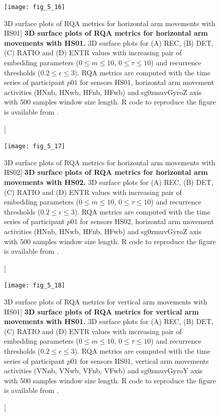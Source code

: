 \begin{figure}
\centering
\texttt{[image: fig\_5\_16]}
    \caption
	[3D surface plots of RQA metrics for horizontal arm movements with HS01]{
	{\bf 3D surface plots of RQA metrics for horizontal arm movements with HS01.}
	3D surface plots for (A) REC, (B) DET, (C) RATIO and (D) ENTR values 
	with increasing pair of embedding parameters 
	($0 \le m \le 10$, $0 \le \tau \le 10$) 
	and recurrence thresholds ($ 0.2 \le \epsilon \le 3 $).
	RQA metrics are computed with the time series of participant $p01$ 
	for sensors HS01, horizontal arm movement activities 
	(HNnb, HNwb, HFnb, HFwb) and 
	sg0zmuvGyroZ axis with 500 samples window size length. 
        R code to reproduce the figure is available from \cite{xochicale2018}.
	}
\label{fig:topo_s_hs01_H_w500}
\end{figure}

\begin{figure}
\centering
\texttt{[image: fig\_5\_17]}
    \caption
	[3D surface plots of RQA metrics for horizontal arm movements with HS02]{
	{\bf 3D surface plots of RQA metrics for horizontal arm movements with HS02.}
	3D surface plots for (A) REC, (B) DET, (C) RATIO and (D) ENTR values 
	with increasing pair of embedding parameters 
	($0 \le m \le 10$, $0 \le \tau \le 10$) 
	and recurrence thresholds ($ 0.2 \le \epsilon \le 3 $).
	RQA metrics are computed with the time series of participant $p01$ 
	for sensors HS02, horizontal arm movement activities 
	(HNnb, HNwb, HFnb, HFwb) and 
	sg0zmuvGyroZ axis with 500 samples window size length. 
        R code to reproduce the figure is available from \cite{xochicale2018}.
	}
\label{fig:topo_s_hs02_H_w500}
\end{figure}

\begin{figure}
\centering
\texttt{[image: fig\_5\_18]}
    \caption
	[3D surface plots of RQA metrics for vertical arm movements with HS01]{
	{\bf 3D surface plots of RQA metrics for vertical arm movements with HS01.}
	3D surface plots for (A) REC, (B) DET, (C) RATIO and (D) ENTR values 
	with increasing pair of embedding parameters 
	($0 \le m \le 10$, $0 \le \tau \le 10$) 
	and recurrence thresholds ($ 0.2 \le \epsilon \le 3 $).
	RQA metrics are computed with the time series of participant $p01$ 
	for sensors HS01, vertical arm movements activities 
	(VNnb, VNwb, VFnb, VFwb) and 
	sg0zmuvGyroY axis with 500 samples window size length. 
        R code to reproduce the figure is available from \cite{xochicale2018}.
	}
\label{fig:topo_s_hs01_V_w500}
\end{figure}


